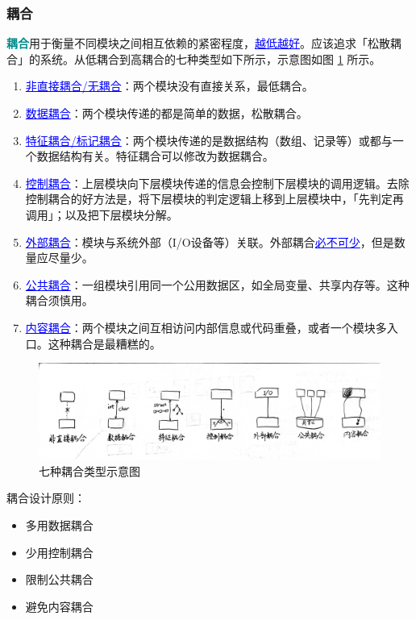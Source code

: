 \documentclass[UTF8]{ctexart}
\newcommand\Concept[1]{\textcolor{darkcyan}{\textbf{#1}}\index{#1}} %
\newcommand\Point[1]{\textcolor{blue}{\uline{#1}}} %
\begin{document}
\subsubsection{耦合}
\Concept{耦合}用于衡量不同模块之间相互依赖的紧密程度，\Point{越低越好}。应该追求「松散耦合」的系统。从低耦合到高耦合的七种类型如下所示，示意图如图 \ref{fig:coupling} 所示。

\begin{enumerate}
    \item \Point{非直接耦合/无耦合}：两个模块没有直接关系，最低耦合。
    \item \Point{数据耦合}：两个模块传递的都是简单的数据，松散耦合。
    \item \Point{特征耦合/标记耦合}：两个模块传递的是数据结构（数组、记录等）或都与一个数据结构有关。特征耦合可以修改为数据耦合。
    \item \Point{控制耦合}：上层模块向下层模块传递的信息会控制下层模块的调用逻辑。去除控制耦合的好方法是，将下层模块的判定逻辑上移到上层模块中，「先判定再调用」；以及把下层模块分解。
    \item \Point{外部耦合}：模块与系统外部（I/O设备等）关联。外部耦合\Point{必不可少}，但是数量应尽量少。
    \item \Point{公共耦合}：一组模块引用同一个公用数据区，如全局变量、共享内存等。这种耦合须慎用。
    \item \Point{内容耦合}：两个模块之间互相访问内部信息或代码重叠，或者一个模块多入口。这种耦合是最糟糕的。
\end{enumerate}

\begin{figure}[htb]
    \centering
    \includegraphics[width=\textwidth]{耦合.jpg}
    \caption{七种耦合类型示意图}\label{fig:coupling}
\end{figure}

耦合设计原则：
\begin{itemize}
    \item 多用数据耦合
    \item 少用控制耦合
    \item 限制公共耦合
    \item 避免内容耦合
\end{itemize}
\end{document}
